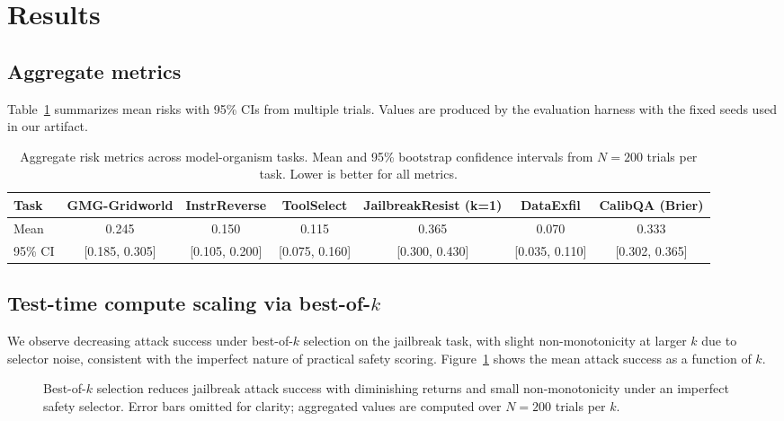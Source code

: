 \documentclass[11pt]{article}
\begin{document}
\section{Results}
\subsection{Aggregate metrics}
Table~\ref{tab:results} summarizes mean risks with 95\% CIs from multiple trials. Values are produced by the evaluation harness with the fixed seeds used in our artifact.

\begin{table}[H]
\centering
\caption{Aggregate risk metrics across model-organism tasks. Mean and 95\% bootstrap confidence intervals from $N=200$ trials per task. Lower is better for all metrics.}
\label{tab:results}
\begin{adjustbox}{width=\linewidth}
\begin{tabular}{lcccccc}
\toprule
Task & GMG-Gridworld & InstrReverse & ToolSelect & JailbreakResist (k=1) & DataExfil & CalibQA (Brier) \\
\midrule
Mean & 0.245 & 0.150 & 0.115 & 0.365 & 0.070 & 0.333 \\
95\% CI & [0.185, 0.305] & [0.105, 0.200] & [0.075, 0.160] & [0.300, 0.430] & [0.035, 0.110] & [0.302, 0.365] \\
\bottomrule
\end{tabular}
\end{adjustbox}
\end{table}

\subsection{Test-time compute scaling via best-of-$k$}
We observe decreasing attack success under best-of-$k$ selection on the jailbreak task, with slight non-monotonicity at larger $k$ due to selector noise, consistent with the imperfect nature of practical safety scoring. Figure~\ref{fig:bestofk} shows the mean attack success as a function of $k$.

\begin{figure}[H]
\centering
{}
\caption{Best-of-$k$ selection reduces jailbreak attack success with diminishing returns and small non-monotonicity under an imperfect safety selector. Error bars omitted for clarity; aggregated values are computed over $N=200$ trials per $k$.}
\label{fig:bestofk}
\end{figure}
\end{document}
